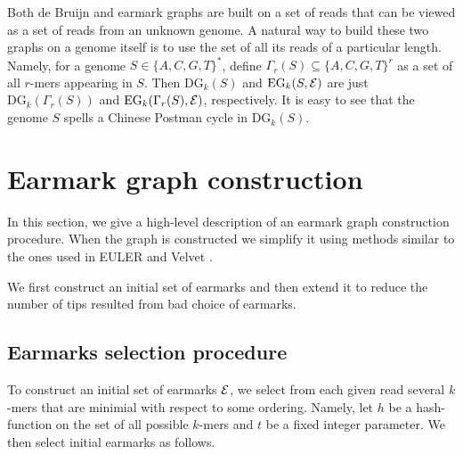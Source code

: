 \documentclass[17pt]{extarticle}
\theoremstyle{definition}
\begin{document}
\begin{multicols}{2}
Both de Bruijn and earmark graphs are built on a set of reads that can be viewed as a 
set of reads from an unknown genome. A natural way to build these two graphs on a genome
itself is to use the set of all its reads of a particular length. Namely, 
for a genome $S \in \{A,C,G,T\}^*$, define $\Gamma_r(S) \subseteq \{A,C,G,T\}^r$
as a set of all $r$-mers appearing in $S$. Then $\textrm{DG}_k(S)$ and $\textrm{EG}_k(S, {\cal E})$
are just $\textrm{DG}_k(\Gamma_r(S))$ and $\textrm{EG}_k(\Gamma_r(S), {\cal E})$, respectively.
It is easy to see that the genome $S$ spells a Chinese Postman cycle in 
$\textrm{DG}_k(S)$.




\section{Earmark graph construction}
In this section, we give a high-level description of an earmark graph construction procedure.
When the graph is constructed we simplify it using methods similar to the ones used in
EULER \cite{PW01} and Velvet \cite{Z08}.

We first construct an initial set of earmarks and then extend it to reduce 
the number of tips
resulted from bad choice of earmarks.

\subsection{Earmarks selection procedure}
To construct an initial set of earmarks ${\cal E}$, we select from each given read 
several $k$-mers that are minimial with respect to some ordering. Namely, 
let $h$ be a hash-function on the set of all possible $k$-mers and $t$ be a 
fixed integer parameter.
We then select initial earmarks as follows.



\end{multicols}
\end{document}
